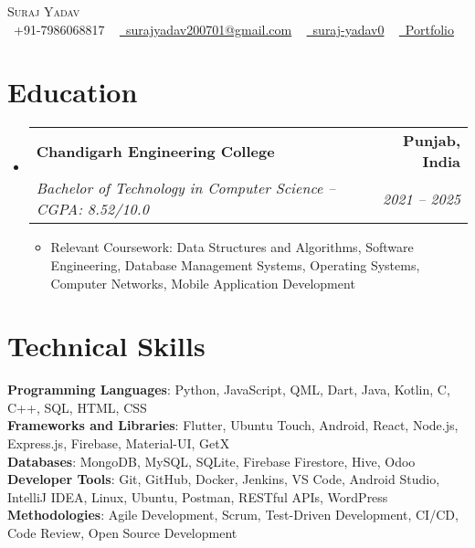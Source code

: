 \documentclass[a4paper,11pt]{article}
\makeatletter
\newcommand{\resumeItem}[1]{
  \item\small{
    {#1 \vspace{-2pt}}
  }
}
\newcommand{\resumeSubheading}[4]{
  \vspace{-2pt}\item
    \begin{tabular*}{1.0\textwidth}[t]{l@{\extracolsep{\fill}}r}
      \textbf{#1} & \textbf{\small #2} \\
      \textit{\small#3} & \textit{\small #4} \\
    \end{tabular*}\vspace{-7pt}
}
\newcommand{\resumeSubHeadingListStart}{\begin{itemize}[leftmargin=0.0in, label={}]}
\newcommand{\resumeSubHeadingListEnd}{\end{itemize}}
\newcommand{\resumeItemListStart}{\begin{itemize}}
\newcommand{\resumeItemListEnd}{\end{itemize}\vspace{-5pt}}
\makeatother
\begin{document}
\begin{center}
    {\Huge \scshape Suraj Yadav} \\ \vspace{1pt}
    \small \raisebox{-0.1\height}\faMobile\ +91-7986068817 ~ 
    \href{mailto:surajyadav200701@gmail.com}{\raisebox{-0.2\height}\faEnvelope\  surajyadav200701@gmail.com} ~ 
    \href{https://github.com/suraj-yadav0}{\raisebox{-0.2\height}\faGithub\ suraj-yadav0} ~
    \href{https://suraj-yadav0.github.io/portfolio-v3/}{\raisebox{-0.2\height}\faGlobe\ Portfolio}
    \vspace{-8pt}
\end{center}

\section{Education}
  \resumeSubHeadingListStart
    \resumeSubheading
      {Chandigarh Engineering College}{Punjab, India}
      {Bachelor of Technology in Computer Science -- CGPA: 8.52/10.0}{2021 -- 2025}
      \resumeItemListStart
        \resumeItem{Relevant Coursework: Data Structures and Algorithms, Software Engineering, Database Management Systems, Operating Systems, Computer Networks, Mobile Application Development}
      \resumeItemListEnd
  \resumeSubHeadingListEnd

\section{Technical Skills}
\begin{itemize}[leftmargin=0.15in, label={}]
    \small{\item{
     \textbf{Programming Languages}{: Python, JavaScript, QML, Dart, Java, Kotlin, C, C++, SQL, HTML, CSS} \\
     \textbf{Frameworks and Libraries}{: Flutter, Ubuntu Touch, Android, React, Node.js, Express.js, Firebase, Material-UI, GetX} \\
     \textbf{Databases}{: MongoDB, MySQL, SQLite, Firebase Firestore, Hive, Odoo} \\
     \textbf{Developer Tools}{: Git, GitHub, Docker, Jenkins, VS Code, Android Studio, IntelliJ IDEA, Linux, Ubuntu, Postman, RESTful APIs, WordPress} \\
     \textbf{Methodologies}{: Agile Development, Scrum, Test-Driven Development, CI/CD, Code Review, Open Source Development}
    }}
\end{itemize}
\vspace{-16pt}
\end{document}
